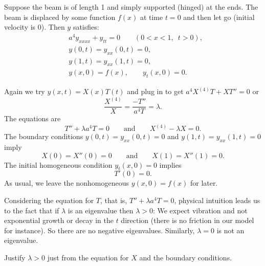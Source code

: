 Suppose the beam is of length 1 and simply supported (hinged) at the ends.
The beam is displaced by some function $f(x)$ at time $t=0$ and then
let go (initial velocity is 0).  Then $y$ satisfies:
\begin{equation} \label{appeig:beameq}
\begin{aligned}
& a^4 y_{xxxx} + y_{tt} = 0 \qquad (0 < x < 1, \enspace t > 0), \\
& y(0,t) = y_{xx}(0,t) = 0 , \\
& y(1,t) = y_{xx}(1,t) = 0 , \\
& y(x,0) = f(x), \qquad y_{t}(x,0) = 0 .
\end{aligned}
\end{equation}

Again we try $y(x,t) = X(x)T(t)$ and plug in to get
$a^4 X^{(4)}T + XT'' = 0$ or 
\begin{equation*}
\frac{X^{(4)}}{X} = \frac{- T''}{a^4T} = \lambda .
\end{equation*}
The equations are
\begin{equation*}
T'' + \lambda a^4 T = 0
\qquad \text{and} \qquad
X^{(4)} - \lambda X = 0 .
\end{equation*}
The boundary conditions
$y(0,t) = y_{xx}(0,t) = 0$ and $y(1,t) = y_{xx}(1,t) = 0$ imply
\begin{equation*}
X(0) =  X''(0) = 0
\qquad \text{and} \qquad
X(1) =  X''(1) = 0 .
\end{equation*}
The initial homogeneous condition $y_t(x,0) = 0$ implies
\begin{equation*}
T'(0) = 0 .
\end{equation*}
As usual, we leave the nonhomogeneous $y(x,0) = f(x)$ for later.

Considering the equation for $T$, that is,
$T'' + \lambda a^4 T = 0$, physical intuition leads us
to the fact that if $\lambda$ is an eigenvalue then $\lambda > 0$:
We expect vibration and not exponential growth or
decay in the $t$ direction (there is no friction in our model for instance).
So there are no negative eigenvalues.
Similarly, $\lambda = 0$ is not an eigenvalue.

\begin{exercise}
Justify $\lambda > 0$ just from the equation for $X$ and the boundary
conditions.
\end{exercise}

